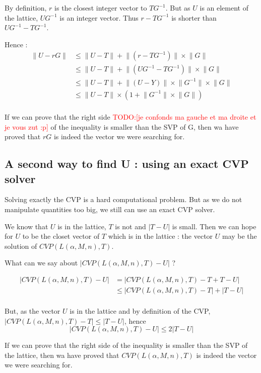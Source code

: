 \documentclass[preprint,svgnames]{iacrtrans}
\newcommand{\todo}[1]{\textcolor{red}{TODO:[#1]}}
\begin{document}
By definition, \(r\) is the closest integer vector to \(TG^{-1}\). But as \(U\) is an element of the lattice, \(UG^{-1}\) is an integer vector. Thus \(r-TG^{-1}\) is shorter than \(UG^{-1}-TG^{-1}\).

Hence :
\begin{align*}
\lVert U - rG \rVert &\leqslant \lVert U - T \rVert + \lVert(r-TG^{-1})\rVert \times \lVert G\rVert\\	
&\leqslant \lVert U - T \rVert + \lVert(UG^{-1}-TG^{-1})\rVert \times \lVert G\rVert\\	
&\leqslant \lVert U - T \rVert + \lVert(U-Y)\rVert \times \lVert G^{-1} \rVert  \times \lVert G\rVert\\
& 	\leqslant \lVert U - T \rVert \times (1 +\lVert G^{-1} \rVert  \times \lVert G\rVert )\\
\end{align*}

If we can prove that the right side \todo{je confonds ma gauche et ma droite et je vous zut :p} of the inequality is smaller than the SVP of G, then wa have proved that \(rG\) is indeed the vector we were searching for.

 \subsection{A second way to find U : using an exact CVP solver}

Solving exactly the CVP is a hard computational problem. But as we do not manipulate quantities too big, we still can use an exact CVP solver.

We know that \(U\) is in the lattice, \(T\) is not and \(|T-U|\) is small. Then we can hope for \(U\) to be the closet vector of \(T\) which is in the lattice : the vector \(U\) may be the solution of \(CVP(L(\alpha,M,n),T)\).

What can we say about \(|CVP(L(\alpha,M,n),T)-U|\) ?

\begin{align*}
|CVP(L(\alpha,M,n),T)-U| &= |CVP(L(\alpha,M,n),T)-T+T-U|\\
& \leqslant |CVP(L(\alpha,M,n),T)-T|+|T-U|\\
\end{align*}

But, as the vector \(U\) is in the lattice and by definition of the CVP, \(|CVP(L(\alpha,M,n),T)-T| \leqslant |T-U| \), hence 
\[|CVP(L(\alpha,M,n),T)-U|\leqslant 2|T-U|\]

If we can prove that the right side of the inequality is smaller than the SVP of the lattice, then wa have proved that \(CVP(L(\alpha,M,n),T)\) is indeed the vector we were searching for.
\end{document}
